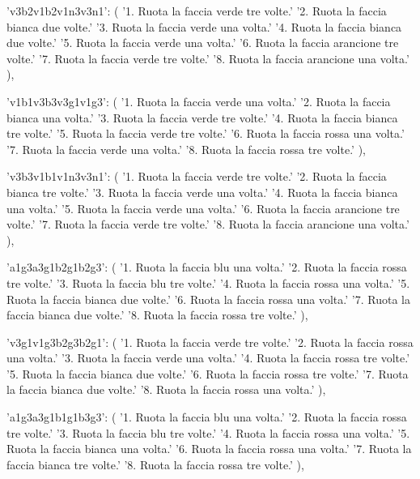 {{        'v3b2v1b2v1n3v3n1': (
            '1. Ruota la faccia verde tre volte.\n'
            '2. Ruota la faccia bianca due volte.\n'
            '3. Ruota la faccia verde una volta.\n'
            '4. Ruota la faccia bianca due volte.\n'
            '5. Ruota la faccia verde una volta.\n'
            '6. Ruota la faccia arancione tre volte.\n'
            '7. Ruota la faccia verde tre volte.\n'
            '8. Ruota la faccia arancione una volta.'
        ),

        'v1b1v3b3v3g1v1g3': (
            '1. Ruota la faccia verde una volta.\n'
            '2. Ruota la faccia bianca una volta.\n'
            '3. Ruota la faccia verde tre volte.\n'
            '4. Ruota la faccia bianca tre volte.\n'
            '5. Ruota la faccia verde tre volte.\n'
            '6. Ruota la faccia rossa una volta.\n'
            '7. Ruota la faccia verde una volta.\n'
            '8. Ruota la faccia rossa tre volte.'
        ),

        'v3b3v1b1v1n3v3n1': (
            '1. Ruota la faccia verde tre volte.\n'
            '2. Ruota la faccia bianca tre volte.\n'
            '3. Ruota la faccia verde una volta.\n'
            '4. Ruota la faccia bianca una volta.\n'
            '5. Ruota la faccia verde una volta.\n'
            '6. Ruota la faccia arancione tre volte.\n'
            '7. Ruota la faccia verde tre volte.\n'
            '8. Ruota la faccia arancione una volta.'
        ),

        'a1g3a3g1b2g1b2g3': (
            '1. Ruota la faccia blu una volta.\n'
            '2. Ruota la faccia rossa tre volte.\n'
            '3. Ruota la faccia blu tre volte.\n'
            '4. Ruota la faccia rossa una volta.\n'
            '5. Ruota la faccia bianca due volte.\n'
            '6. Ruota la faccia rossa una volta.\n'
            '7. Ruota la faccia bianca due volte.\n'
            '8. Ruota la faccia rossa tre volte.'
        ),

        'v3g1v1g3b2g3b2g1': (
            '1. Ruota la faccia verde tre volte.\n'
            '2. Ruota la faccia rossa una volta.\n'
            '3. Ruota la faccia verde una volta.\n'
            '4. Ruota la faccia rossa tre volte.\n'
            '5. Ruota la faccia bianca due volte.\n'
            '6. Ruota la faccia rossa tre volte.\n'
            '7. Ruota la faccia bianca due volte.\n'
            '8. Ruota la faccia rossa una volta.'
        ),

        'a1g3a3g1b1g1b3g3': (
            '1. Ruota la faccia blu una volta.\n'
            '2. Ruota la faccia rossa tre volte.\n'
            '3. Ruota la faccia blu tre volte.\n'
            '4. Ruota la faccia rossa una volta.\n'
            '5. Ruota la faccia bianca una volta.\n'
            '6. Ruota la faccia rossa una volta.\n'
            '7. Ruota la faccia bianca tre volte.\n'
            '8. Ruota la faccia rossa tre volte.'
        ),

}}
